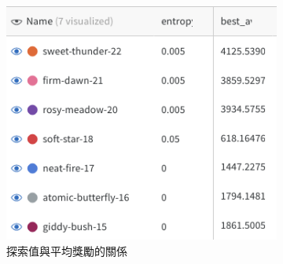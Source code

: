 \begin{figure}[h]
    \centering
    \begin{subfigure}[b]{0.48\textwidth}
        \centering
        \includegraphics[width=\textwidth]{figures/The importance of exploration value.png}
        \caption{探索值與平均獎勵的關係}
        \label{fig:exploration_value}
    \end{subfigure}
    \hfill
    \begin{subfigure}[b]{0.48\textwidth}
        \centering

\end{subfigure}
\end{figure}
